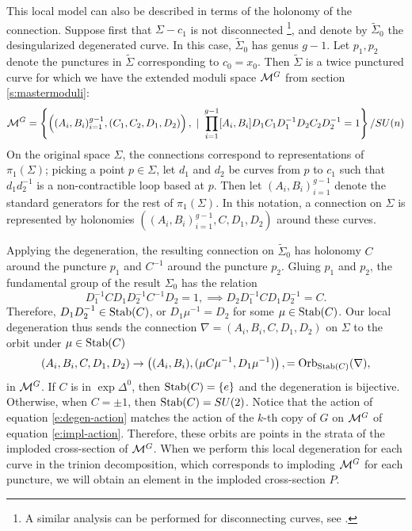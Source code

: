 	This local model can also be described in terms of the holonomy of the connection. Suppose first that $\Sigma - c_1$ is not disconnected \footnote{A similar analysis can be performed for disconnecting curves, see \cite[Page 10]{biswas_degenerations_2021}.}, and denote by $\tilde{\Sigma}_0$ the desingularized degenerated curve. In this case, $\tilde{\Sigma}_0$ has genus $g-1$. Let $p_1, p_2$ denote the punctures in $\tilde{\Sigma}$ corresponding to $c_0 = x_0$. Then $\tilde{\Sigma}$ is a twice punctured curve for which we have the extended moduli space $\mathcal{M}^G$ from section \ref{s:mastermoduli}:
	\begin{equation}
		\mathcal{M}^G = \left\{\left((A_i,B_i)_{i=1}^{g-1}, (C_1,C_2,D_1,D_2)\right), ~|~ \prod_{i=1}^{g-1}[A_i,B_i]D_1C_1D_1^{-1}D_2C_2D_2^{-1} = 1\right\} / SU(n)
	\end{equation}
	On the original space $\Sigma$, the connections correspond to representations of $\pi_1(\Sigma)$; picking a point $p\in\Sigma$, let $d_1$ and $d_2$ be curves from $p$ to $c_1$ such that $d_1d^{-1}_2$ is a non-contractible loop based at $p$. Then let $(A_i,B_i)_{i=1}^{g-1}$ denote the standard generators for the rest of $\pi_1(\Sigma)$. In this notation, a connection on $\Sigma$ is represented by holonomies $\left((A_i,B_i)_{i=1}^{g-1}, C,D_1,D_2\right)$ around these curves.
	
	Applying the degeneration, the resulting connection on $\tilde{\Sigma}_0$ has holonomy $C$ around the puncture $p_1$ and $C^{-1}$ around the puncture $p_2$. Gluing $p_1$ and $p_2$, the fundamental group of the result $\Sigma_0$ has the relation
	\begin{equation}
	 D_1^{-1}CD_1D_2^{-1}C^{-1}D_2 = 1, \implies D_2D_1^{-1}CD_1D_2^{-1} = C.
	\end{equation}
	Therefore, $D_1D_2^{-1} \in \text{Stab}(C)$, or $D_1\mu^{-1} = D_2$ for some $\mu\in \text{Stab}(C)$. Our local degeneration thus sends the connection $\nabla = (A_i,B_i,C,D_1,D_2)$ on $\Sigma$ to the orbit under $\mu \in \text{Stab}(C)$
	\begin{equation}
		\label{e:degen-action}
		(A_i,B_i,C,D_1,D_2) \to \left(
		(A_i,B_i), (\mu C \mu^{-1}, D_1\mu^{-1})\right), 
		= \text{Orb}_{\text{Stab} (C)} (\nabla),
	\end{equation}
	in $\mathcal{M}^G$. If $C$ is in $\exp \Delta^0$, then $\text{Stab}(C) = \{e\}$ and the degeneration is bijective. Otherwise, when $C = \pm 1$, then $\text{Stab}(C) = SU(2)$. Notice that the action of equation \ref{e:degen-action} matches the action of the $k$-th copy of $G$ on $\mathcal{M}^G$ of equation \ref{e:impl-action}. Therefore, these orbits are points in the strata of the imploded cross-section of $\mathcal{M}^G$. When we perform this local degeneration for each curve in the trinion decomposition, which corresponds to imploding $\mathcal{M}^G$ for each puncture, we will obtain an element in the imploded cross-section $P$. 
 	
